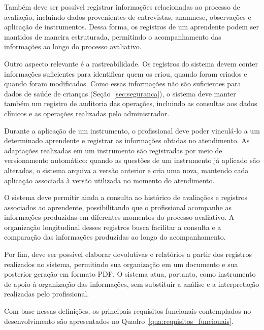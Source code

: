 Também deve ser possível registrar informações relacionadas ao processo de avaliação, incluindo dados provenientes de entrevistas, anamnese, observações e aplicação de instrumentos. Dessa forma, os registros de um aprendente podem ser mantidos de maneira estruturada, permitindo o acompanhamento das informações ao longo do processo avaliativo.

Outro aspecto relevante é a rastreabilidade. Os registros do sistema devem conter informações suficientes para identificar quem os criou, quando foram criados e quando foram modificados. Como essas informações não são suficientes para dados de saúde de crianças (Seção~\ref{sec:seguranca}), o sistema deve manter também um registro de auditoria das operações, incluindo as consultas aos dados clínicos e as operações realizadas pelo administrador.

Durante a aplicação de um instrumento, o profissional deve poder vinculá-lo a um determinado aprendente e registrar as informações obtidas no atendimento. As adaptações realizadas em um instrumento são registradas por meio de versionamento automático: quando as questões de um instrumento já aplicado são alteradas, o sistema arquiva a versão anterior e cria uma nova, mantendo cada aplicação associada à versão utilizada no momento do atendimento.

O sistema deve permitir ainda a consulta ao histórico de avaliações e registros associados ao aprendente, possibilitando que o profissional acompanhe as informações produzidas em diferentes momentos do processo avaliativo. A organização longitudinal desses registros busca facilitar a consulta e a comparação das informações produzidas ao longo do acompanhamento.

Por fim, deve ser possível elaborar devolutivas e relatórios a partir dos registros realizados no sistema, permitindo sua organização em um documento e sua posterior geração em formato PDF. O sistema atua, portanto, como instrumento de apoio à organização das informações, sem substituir a análise e a interpretação realizadas pelo profissional.

Com base nessas definições, os principais requisitos funcionais contemplados no desenvolvimento são apresentados no Quadro~\ref{qua:requisitos_funcionais}.

